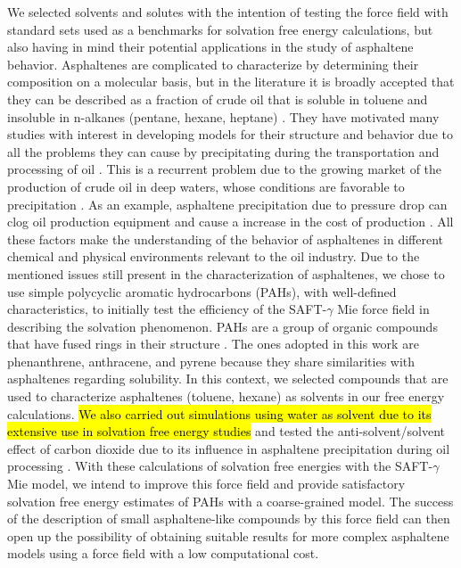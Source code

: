 \documentclass[final,12p,times,twocolumn]{elsarticle}
\begin{document}
	We selected solvents and solutes with the intention of testing the force field with standard sets used as a benchmarks for solvation free energy calculations, but also having in mind their potential applications in the study of asphaltene behavior. Asphaltenes are complicated to characterize by determining their composition on a molecular basis, but in the literature it is broadly accepted that they can be described as a fraction of crude oil that is soluble in toluene and insoluble in n-alkanes (pentane, hexane, heptane) \cite{SJOBLOM2003399}. They have motivated many studies with interest in developing models for their structure and behavior due to all the problems they can cause by precipitating during the transportation and processing of oil \cite{SJOBLOM20151}. This is a recurrent problem due to the growing market of the production of crude oil in deep waters, whose conditions are favorable to precipitation \cite{AIC:AIC10243}. As an example, asphaltene precipitation due to pressure drop can clog oil production equipment and cause a increase in the cost of production \cite{doi:10.1021/ef010047l}. All these factors make the understanding of the behavior of asphaltenes in different chemical and physical environments relevant to the oil industry. Due to the mentioned issues still present in the characterization of asphaltenes, we chose to use simple polycyclic aromatic hydrocarbons (PAHs), with well-defined characteristics, to initially test the efficiency of the SAFT-$\gamma$ Mie force field in describing the solvation phenomenon. PAHs are a group of organic compounds that have fused rings in their structure \cite{RAVINDRA20082895}. The ones adopted in this work are phenanthrene, anthracene, and pyrene because they share similarities with asphaltenes regarding solubility. In this context, we selected compounds that are used to characterize asphaltenes (toluene, hexane)  as solvents in our free energy calculations. \hl{We also carried out simulations using  water as solvent due to its extensive use in solvation free energy studies}  and tested the anti-solvent/solvent effect of carbon dioxide due to its influence in asphaltene precipitation during oil processing \cite{SOROUSH2014405}. With these calculations of solvation free energies with the SAFT-$\gamma$ Mie model, we intend to improve this force field and provide satisfactory solvation free energy estimates of PAHs with a coarse-grained model. The success of the description of small asphaltene-like compounds by this force field can then open up the possibility of obtaining suitable results for more complex asphaltene models using a force field with a low computational cost.
\end{document}
